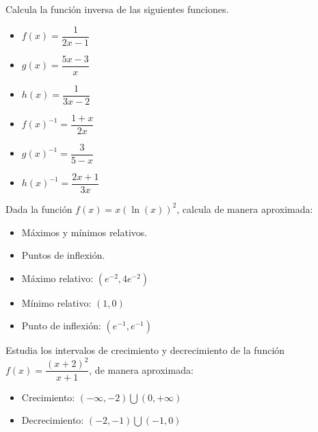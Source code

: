 \begin{ex}
	Calcula la función inversa de las siguientes funciones.
	\begin{itemize}
		\item $f(x) = \dfrac{1}{2x-1}$
		\item $g(x) = \dfrac{5x-3}{x}$
		\item $h(x) = \dfrac{1}{3x-2}$
	\end{itemize}

	\begin{sol}
		\begin{itemize}
			\item $f(x)^{-1} = \dfrac{1+x}{2x}$
			\item $g(x)^{-1} = \dfrac{3}{5-x}$
			\item $h(x)^{-1} = \dfrac{2x+1}{3x}$
		\end{itemize}
	\end{sol}
\end{ex}

\vspace{1cm}


\begin{ex}
	Dada la función $f(x)  = x(\ln (x))^{2}$, calcula de manera aproximada:
	\begin{itemize}
		\item Máximos y mínimos relativos.
		\item Puntos de inflexión.
	\end{itemize}
	\begin{sol}
		\begin{itemize}
			\item Máximo relativo: $(e^{-2}, 4e^{-2})$
			\item Mínimo relativo: $(1,0)$
			\item Punto de inflexión: $(e^{-1}, e^{-1})$
		\end{itemize}
	\end{sol}
\end{ex}

\vspace{1cm}


\begin{ex}
	Estudia los intervalos de crecimiento y decrecimiento de la función $f(x) = \dfrac{(x+2)^2}{x+1}$, de manera aproximada:
	\begin{sol}
		\begin{itemize}
			\item Crecimiento: $(-\infty, -2) \bigcup (0, +\infty)$
			\item Decrecimiento: $(-2, -1) \bigcup (-1, 0)$
		\end{itemize}
	\end{sol}
\end{ex}

